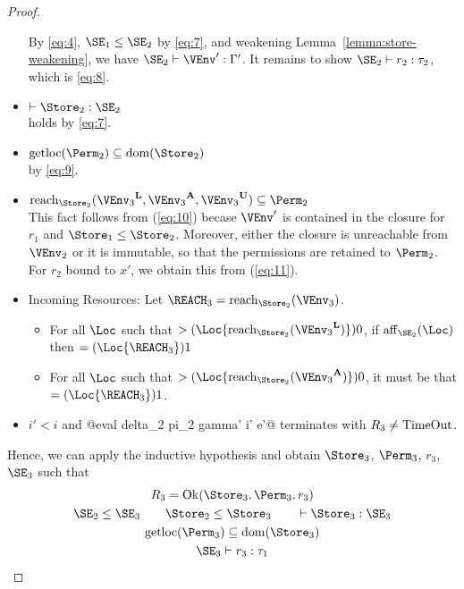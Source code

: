 \begin{proof}
\begin{itemize}
    By \eqref{eq:4}, $\SE_1\le\SE_2$ by \eqref{eq:7}, and weakening
    Lemma~\ref{lemma:store-weakening}, we have
    $\SE_2 \vdash \VEnv' : \E'$.
    It remains to show $\SE_2 \vdash r_2 : \tau_2$, which is
    \eqref{eq:8}.
  \item  $\vdash \Store_2 : \SE_2$\\
    holds by \eqref{eq:7}.
  \item  $\Rawloc{\Perm_2} \subseteq \Dom{\Store_2}$\\
    by \eqref{eq:9}.
  \item $\Reach{\Store_2}{\Active{\VEnv_3}, \MutableBorrows{\VEnv_3}, \ImmutableBorrows{\VEnv_3}} \subseteq \Perm_2$\\
    This fact follows from (\ref{eq:10}) becase $\VEnv'$ is contained
    in the closure for $r_1$ and $\Store_1 \le \Store_2$. Moreover,
    either the closure is unreachable from $\VEnv_2$ or it is
    immutable, so that the permissions are retained to $\Perm_2$.
    For $r_2$ bound to $x'$, we obtain this from (\ref{eq:11}).
  \item Incoming Resources: Let $\REACH_3 = \Reach{\Store_2}{\VEnv_3}$.
    \begin{itemize}
    \item
      For all $\Loc$ such that $\MultiNumber\Loc{\Reach{\Store_2}{\Active{\VEnv_3}}} >0$,
      if $\Affine{\SE_2}\Loc$ then $\MultiNumber\Loc{\REACH_3}= 1$
    \item For all $\Loc$ such that $
      \MultiNumber\Loc{\Reach{\Store_2}{\MutableBorrows{\VEnv_3}}} >0$, it
      must be that $\MultiNumber\Loc{\REACH_3}=1$.
    \end{itemize}
  \item $i'<i$ and  @eval delta_2 pi_2 gamma' i' e'@ terminates
    with $R_3 \ne \operatorname{TimeOut}$.
  \end{itemize}
  Hence, we can apply the inductive hypothesis and obtain
  $\Store_3$, $\Perm_3$, $r_3$, $\SE_3$ such that
  \begin{gather}
    R_3 = \Ok{\Store_3, \Perm_3, r_3}
    \\\label{eq:12}
    \SE_2 \le \SE_3 \qquad
    \Store_2 \le \Store_3 \qquad
    \vdash \Store_3 :  \SE_3
    \\\label{eq:13}
    \Rawloc{\Perm_3} \subseteq \Dom{\Store_3}
    \\\label{eq:14}
    \SE_3 \vdash r_3 : \tau_1

\end{gather}
\end{proof}

